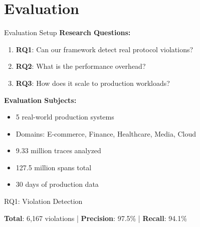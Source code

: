 \documentclass[aspectratio=169,xcolor=dvipsnames]{beamer}
\begin{document}
\section{Evaluation}

\begin{frame}{Evaluation Setup}
\textbf{Research Questions:}
\begin{enumerate}
    \item \textbf{RQ1}: Can our framework detect real protocol violations?
    \item \textbf{RQ2}: What is the performance overhead?
    \item \textbf{RQ3}: How does it scale to production workloads?
\end{enumerate}

\vspace{1em}
\textbf{Evaluation Subjects:}
\begin{itemize}
    \item 5 real-world production systems
    \item Domains: E-commerce, Finance, Healthcare, Media, Cloud
    \item 9.33 million traces analyzed
    \item 127.5 million spans total
    \item 30 days of production data
\end{itemize}
\end{frame}

\begin{frame}{RQ1: Violation Detection}
\begin{center}
\end{center}

\textbf{Total}: 6,167 violations | \textbf{Precision}: 97.5\% | \textbf{Recall}: 94.1\%
\end{frame}
\end{document}
